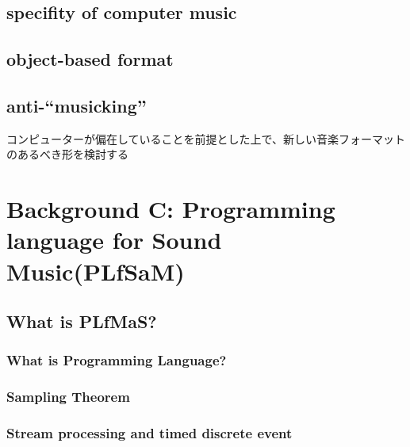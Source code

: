 \hypertarget{specifity-of-computer-music}{%
\section{specifity of computer
music}\label{specifity-of-computer-music}}

\hypertarget{object-based-format}{%
\section{object-based format}\label{object-based-format}}

\hypertarget{anti-musicking}{%
\section{anti-``musicking''}\label{anti-musicking}}

コンピューターが偏在していることを前提とした上で、新しい音楽フォーマットのあるべき形を検討する

\hypertarget{background-c-programming-language-for-sound-musicplfsam}{%
\chapter{Background C: Programming language for Sound
Music(PLfSaM)}\label{background-c-programming-language-for-sound-musicplfsam}}

\hypertarget{what-is-plfmas}{%
\section{What is PLfMaS?}\label{what-is-plfmas}}

\hypertarget{what-is-programming-language}{%
\subsection{What is Programming
Language?}\label{what-is-programming-language}}

\hypertarget{sampling-theorem}{%
\subsection{Sampling Theorem}\label{sampling-theorem}}

\hypertarget{stream-processing-and-timed-discrete-event}{%
\subsection{Stream processing and timed discrete
event}\label{stream-processing-and-timed-discrete-event}}

